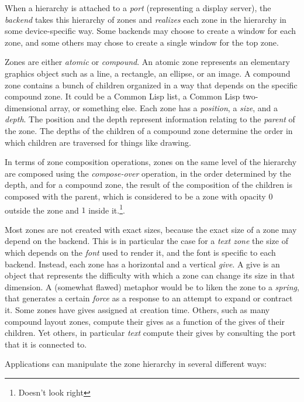 \documentclass{report}
\def\cl{Common Lisp}
\begin{document}
When a hierarchy is attached to a \emph{port} (representing a display
server), the \emph{backend} takes this hierarchy of zones and
\emph{realizes} each zone in the hierarchy in some device-specific
way.  Some backends may choose to create a window for each zone, and
some others may chose to create a single window for the top zone. 

Zones are either \emph{atomic} or \emph{compound}.  An atomic
zone represents an elementary graphics object such as a line, a
rectangle, an ellipse, or an image.  A compound zone contains
a bunch of children organized in a way that depends on the specific
compound zone.  It could be a \cl{} list, a \cl{} two-dimensional
array, or something else.  Each zone has a \emph{position}, a
\emph{size}, and a \emph{depth}.  The position and the depth represent
information relating to the \emph{parent} of the zone.  The depths 
of the children of a compound zone determine the order in which
children are traversed for things like drawing. 

In terms of zone composition operations, zones on the same level
of the hierarchy are composed using the \emph{compose-over} operation,
in the order determined by the depth, and for a compound
zone, the result of the composition of the children is composed with
the parent, which is considered to be a zone with opacity $0$
outside the zone and $1$ inside it.\footnote{Doesn't look right}.

Most zones are not created with exact sizes, because the exact size of
a zone may depend on the backend.  This is in particular the case for
a \emph{text zone} the size of which depends on the \emph{font} used
to render it, and the font is specific to each backend.  Instead, each
zone has a horizontal and a vertical \emph{give}.  A give is an object
that represents the difficulty with which a zone can change its size
in that dimension.  A (somewhat flawed) metaphor would be to liken the
zone to a \emph{spring}, that generates a certain \emph{force} as a
response to an attempt to expand or contract it.  Some zones have
gives assigned at creation time.  Others, such as many compound layout
zones, compute their gives as a function of the gives of their
children.  Yet others, in particular \emph{text} compute their gives
by consulting the port that it is connected to.

Applications can manipulate the zone hierarchy in several different
ways:  
\end{document}
